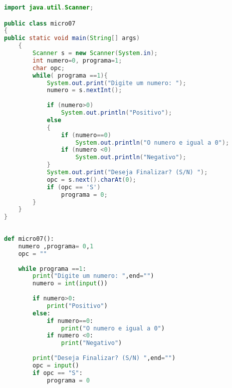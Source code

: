 \documentclass[hidelinks,12pt]{article}
\begin{document}
	\begin{lstlisting}[caption=Código em Java,language=java]
import java.util.Scanner;

public class micro07
{
public static void main(String[] args)
	{
		Scanner s = new Scanner(System.in);
		int numero=0, programa=1;
		char opc;
		while( programa ==1){
			System.out.print("Digite um numero: ");
			numero = s.nextInt();
			
			if (numero>0)
				System.out.println("Positivo");
			else
			{
				if (numero==0)
					System.out.println("O numero e igual a 0");
				if (numero <0)
					System.out.println("Negativo");
			}
			System.out.print("Deseja Finalizar? (S/N) ");
			opc = s.next().charAt(0);
			if (opc == 'S')
				programa = 0;
		}
	}
}	
	
	\end{lstlisting}
	
	\begin{lstlisting}[caption=Código em python,language=Python]
def micro07():
	numero ,programa= 0,1
	opc = ""
	
	while programa ==1:
		print("Digite um numero: ",end="")
		numero = int(input())
		
		if numero>0:
			print("Positivo")
		else:
			if numero==0:
				print("O numero e igual a 0")
			if numero <0:
				print("Negativo")
			
		print("Deseja Finalizar? (S/N) ",end="")
		opc = input()
		if opc == "S":
			programa = 0	
	
	\end{lstlisting}
	
\end{document}
